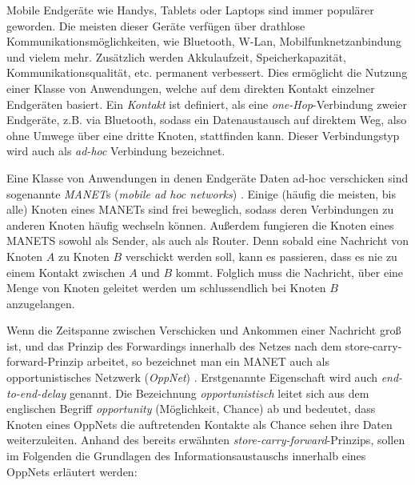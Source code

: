 \documentclass[a4paper, 12pt]{article}
\begin{document}

Mobile Endgeräte wie Handys, Tablets oder Laptops sind immer populärer geworden. Die meisten dieser Geräte verfügen über drathlose Kommunikationsmöglichkeiten, wie Bluetooth, W-Lan, Mobilfunknetzanbindung und vielem mehr. Zusätzlich werden Akkulaufzeit, Speicherkapazität, Kommunikationsqualität, etc. permanent verbessert. Dies ermöglicht die Nutzung einer Klasse von Anwendungen, welche auf dem direkten Kontakt einzelner Endgeräten basiert. Ein \emph{Kontakt} ist definiert, als eine \emph{one-Hop}-Verbindung zweier Endgeräte, z.B. via Bluetooth, sodass ein Datenaustausch auf direktem Weg, also ohne Umwege über eine dritte Knoten, stattfinden kann. Dieser Verbindungstyp wird auch als \emph{ad-hoc} Verbindung bezeichnet.

Eine Klasse von Anwendungen in denen Endgeräte Daten ad-hoc verschicken sind sogenannte \emph{MANET}s (\emph{mobile ad hoc networks}) \cite[p.~2]{zeng2011multihop}. Einige (häufig die meisten, bis alle) Knoten eines MANETs sind frei beweglich, sodass deren Verbindungen zu anderen Knoten häufig wechseln können. Außerdem fungieren die Knoten eines MANETS sowohl als Sender, als auch als Router. Denn sobald eine Nachricht von Knoten $A$ zu Knoten $B$ verschickt werden soll, kann es passieren, dass es nie zu einem Kontakt zwischen $A$ und $B$ kommt. Folglich muss die Nachricht, über eine Menge von Knoten geleitet werden um schlussendlich bei Knoten $B$ anzugelangen.

Wenn die Zeitspanne zwischen Verschicken und Ankommen einer Nachricht groß ist, und das Prinzip des Forwardings innerhalb des Netzes nach dem store-carry-forward-Prinzip arbeitet, so bezeichnet man ein MANET auch als opportunistisches Netzwerk (\emph{OppNet}) \cite{Mota20145}.
Erstgenannte Eigenschaft wird auch \emph{end-to-end-delay} genannt.
Die Bezeichnung \emph{opportunistisch} leitet sich aus dem englischen Begriff \emph{opportunity} (Möglichkeit, Chance) ab und bedeutet, dass Knoten eines OppNets die auftretenden Kontakte als Chance sehen ihre Daten weiterzuleiten.
Anhand des bereits erwähnten \emph{store-carry-forward}-Prinzips, sollen im Folgenden die Grundlagen des Informationsaustauschs innerhalb eines OppNets erläutert werden:
\end{document}
